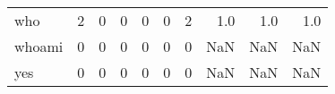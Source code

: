 \begin{longtable}{lrrrrrrrrr}
who       &                                       2 &                                                  0 &                                                  0 &                                                  0 &                                                  0 &                                                  2 &                                                1.0 &                                    1.0 &                                  1.0 \\
whoami    &                                       0 &                                                  0 &                                                  0 &                                                  0 &                                                  0 &                                                  0 &                                                NaN &                                    NaN &                                  NaN \\
yes       &                                       0 &                                                  0 &                                                  0 &                                                  0 &                                                  0 &                                                  0 &                                                NaN &                                    NaN &                                  NaN \\
\end{longtable}
